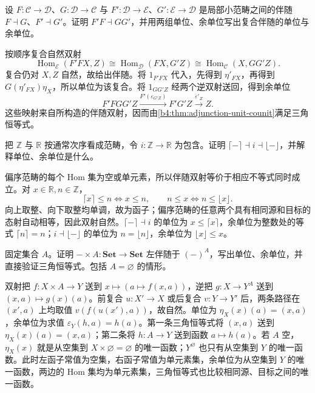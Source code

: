 \begin{exercise}\label{b4:ex:03-composite-adjunction}
	设 \(F:\mathcal C\rightarrow\mathcal D\)、\(G:\mathcal D\rightarrow\mathcal C\) 与 \(F':\mathcal D\rightarrow\mathcal E\)、\(G':\mathcal E\rightarrow\mathcal D\) 是局部小范畴之间的伴随 \(F\dashv G\)、\(F'\dashv G'\)。证明 \(F'F\dashv GG'\)，并用两组单位、余单位写出复合伴随的单位与余单位。
\end{exercise}
\begin{solution}
	按顺序复合自然双射
	\[
		\operatorname{Hom}_{\mathcal E}(F'FX,Z) \cong\operatorname{Hom}_{\mathcal D}(FX,G'Z) \cong\operatorname{Hom}_{\mathcal C}(X,GG'Z).
	\]
	复合仍对 \(X,Z\) 自然，故给出伴随。将 \(1_{F'FX}\) 代入，先得到 \(\eta'_{FX}\)，再得到 \(G(\eta'_{FX})\eta_X\)，所以单位为该复合。将 \(1_{GG'Z}\) 经两个逆双射送回，得到余单位
	\[
		F'FGG'Z\xrightarrow{F'(\varepsilon_{G'Z})}F'G'Z \xrightarrow{\varepsilon'_Z}Z.
	\]
	这些映射来自所构造的伴随双射，因而由\cref{b4:thm:adjunction-unit-counit}满足三角恒等式。
\end{solution}

\begin{exercise}\label{b4:ex:03-rounding-adjoints}
	把 \(\mathbb Z\) 与 \(\mathbb R\) 按通常次序看成范畴，令 \(i:\mathbb Z\rightarrow\mathbb R\) 为包含。证明 \(\lceil-\rceil\dashv i\dashv\lfloor-\rfloor\)，并解释单位、余单位是什么。
\end{exercise}
\begin{solution}
	偏序范畴的每个 Hom 集为空或单元素，所以伴随双射等价于相应不等式同时成立。对 \(x\in\mathbb R,n\in\mathbb Z\)，
	\[
		\lceil x\rceil\le n\iff x\le n, \qquad n\le x\iff n\le\lfloor x\rfloor.
	\]
	向上取整、向下取整均单调，故为函子；偏序范畴的任意两个具有相同源和目标的态射自动相等，因此双射自然。\(\lceil-\rceil\dashv i\) 的单位为 \(x\le\lceil x\rceil\)，余单位为整数处的等式 \(\lceil n\rceil=n\)；\(i\dashv\lfloor-\rfloor\) 的单位为 \(n=\lfloor n\rfloor\)，余单位为 \(\lfloor x\rfloor\le x\)。
\end{solution}

\begin{exercise}\label{b4:ex:03-set-exponential-adjunction}
	固定集合 \(A\)。证明 \(-\times A:\mathbf{Set}\rightarrow\mathbf{Set}\) 左伴随于 \((-)^A\)，写出单位、余单位，并直接验证三角恒等式。包括 \(A=\varnothing\) 的情形。
\end{exercise}
\begin{solution}
	双射把 \(f:X\times A\rightarrow Y\) 送到 \(x\mapsto(a\mapsto f(x,a))\)，逆把 \(g:X\rightarrow Y^A\) 送到 \((x,a)\mapsto g(x)(a)\)。前复合 \(u:X'\rightarrow X\) 或后复合 \(v:Y\rightarrow Y'\) 后，两条路径在 \((x',a)\) 上均取值 \(v(f(u(x'),a))\)，故自然。单位为 \(\eta_X(x)(a)=(x,a)\)，余单位为求值 \(\varepsilon_Y(h,a)=h(a)\)。第一条三角恒等式将 \((x,a)\) 送到 \(\eta_X(x)(a)=(x,a)\)；第二条将 \(h:A\rightarrow Y\) 送到函数 \(a\mapsto h(a)\)。若 \(A\) 空，\(\eta_X(x)\) 就是从空集到 \(X\times\varnothing=\varnothing\) 的唯一函数；\(Y^\varnothing\) 也只有从空集到 \(Y\) 的唯一函数。此时左函子常值为空集，右函子常值为单元素集，余单位为从空集到 \(Y\) 的唯一函数，两边的 Hom 集均为单元素集，三角恒等式也比较相同源、目标之间的唯一函数。
\end{solution}

